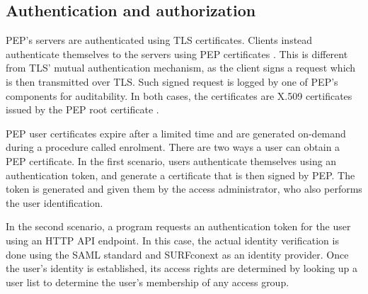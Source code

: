\documentclass{report}
\begin{document}
\subsection{Authentication and authorization}
PEP's servers are authenticated using TLS certificates. Clients instead authenticate themselves to the servers using PEP certificates \cite{pep-blueprint}. This is different from
TLS' mutual authentication mechanism, as the client signs a request which is then transmitted over TLS. Such signed request is logged by one of PEP's components for auditability. In
both cases, the certificates are X.509 certificates \cite{X.509} issued by the PEP root certificate \cite{pep-blueprint}. \par
PEP user certificates expire after a limited time and are generated on-demand during a procedure called enrolment. 
There are two ways a user can obtain a PEP certificate. In the first scenario, users authenticate themselves using an authentication token, and generate a certificate that is then
signed by PEP. The token is generated and given them by the access administrator, who also performs the user identification. \par
In the second scenario, a program requests an authentication token for the user using an HTTP API endpoint. In this case, the actual identity verification is done using the SAML standard \cite{sstc-saml-core-errata-2.0-wd-07} and SURFconext \cite{surfconext} as an identity provider. Once the user's identity is established, its access rights are determined by looking up a user list to determine the user's membership of any access group. 
\end{document}
